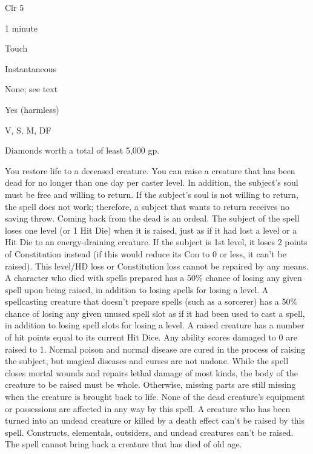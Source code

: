 
\begin{description*}
\item[Level:] Clr 5
\item[Casting Time:] 1 minute
\item[Range:] Touch
\item[Duration:] Instantaneous
\item[Saving Throw:] None; see text
\item[Spell Resistance:] Yes (harmless)
\item[Components:] V, S, M, DF
\item[Arcane Material Component:] Diamonds worth a total of least 5,000 gp.
\end{description*}

You restore life to a deceased creature. You can raise a creature that has been
dead for no longer than one day per caster level. In addition, the subject's soul
must be free and willing to return. If the subject's soul is not willing to return,
the spell does not work; therefore, a subject that wants to return receives no
saving throw.
Coming back from the dead is an ordeal. The subject of the spell loses one level
(or 1 Hit Die) when it is raised, just as if it had lost a level or a Hit Die to
an energy-draining creature. If the subject is 1st level, it loses 2 points of
Constitution instead (if this would reduce its Con to 0 or less, it can't be raised).
This level/HD loss or Constitution loss cannot be repaired by any means. A character
who died with spells prepared has a 50\% chance of losing any given spell upon
being raised, in addition to losing spells for losing a level. A spellcasting creature
that doesn't prepare spells (such as a sorcerer) has a 50\% chance of losing any
given unused spell slot as if it had been used to cast a spell, in addition to
losing spell slots for losing a level.
A raised creature has a number of hit points equal to its current Hit Dice. Any
ability scores damaged to 0 are raised to 1. Normal poison and normal disease are
cured in the process of raising the subject, but magical diseases and curses are
not undone. While the spell closes mortal wounds and repairs lethal damage of most
kinds, the body of the creature to be raised must be whole. Otherwise, missing
parts are still missing when the creature is brought back to life. None of the
dead creature's equipment or possessions are affected in any way by this spell.
A creature who has been turned into an undead creature or killed by a death effect
can't be raised by this spell. Constructs, elementals, outsiders, and undead creatures
can't be raised. The spell cannot bring back a creature that has died of old age.